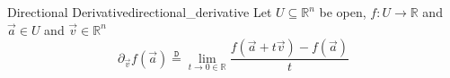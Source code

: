 \begin{definition}{Directional Derivative}{directional_derivative}
    Let $ U \subseteq \mathbb{R} ^{ n } $ be open, $f : U \to \mathbb{R} $ and $ \vec{a} \in  U $ and $ \vec{v} \in  \mathbb{R} ^{ n }  $ 
    \[
        \partial_{\vec{v}} f \left( \vec{a}  \right) \stackrel{\mathtt{D}}{=} \lim_{ t \to 0 \in \mathbb{R}  } \frac{f\left( \vec{a} + t \vec{v}  \right) - f\left( \vec{a}  \right) }{t}
    \]
\end{definition}

